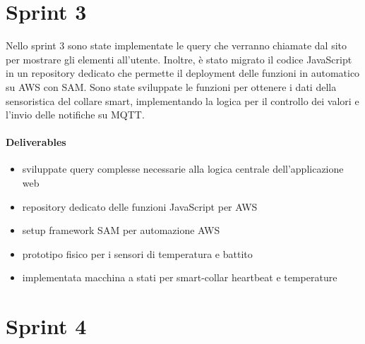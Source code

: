 \section{Sprint 3}
Nello sprint 3 sono state implementate le query che verranno chiamate dal sito per mostrare gli elementi all'utente. Inoltre, è stato migrato il codice JavaScript in un repository dedicato che permette il deployment delle funzioni in automatico su AWS con SAM. Sono state sviluppate le funzioni per ottenere i dati della sensoristica del collare smart, implementando la logica per il controllo dei valori e l'invio delle notifiche su MQTT.
\paragraph{Deliverables}
\begin{itemize}
    \item sviluppate query complesse necessarie alla logica centrale dell'applicazione web
    \item repository dedicato delle funzioni JavaScript per AWS
    \item setup framework SAM per automazione AWS
    \item prototipo fisico per i sensori di temperatura e battito
    \item implementata macchina a stati per smart-collar heartbeat e temperature
\end{itemize}

\section{Sprint 4}


